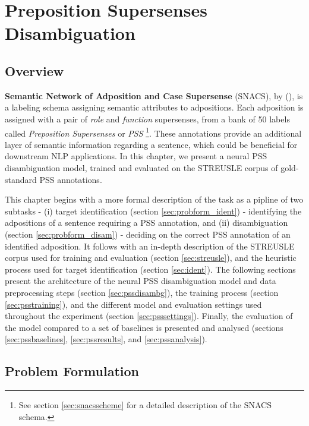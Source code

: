 
\chapter{Preposition Supersenses Disambiguation} %

\label{Chapter2} %

\section{Overview}
\textbf{Semantic Network of Adposition and Case Supersense} (SNACS), by (\cite{snacs}), is a labeling schema assigning semantic attributes to adpositions. Each adposition is assigned with a pair of \emph{role} and \emph{function} supersenses, from a bank of 50 labels called \emph{Preposition Supersenses} or \emph{PSS} \footnote{See section \ref{sec:snacsscheme} for a detailed description of the SNACS schema.}. These annotations provide an additional layer of semantic information regarding a sentence, which could be beneficial for downstream NLP applications. In this chapter, we present a neural PSS disambiguation model, trained and evaluated on the STREUSLE corpus of gold-standard PSS annotations. 

This chapter begins with a more formal description of the task as a pipline of two subtasks - (i) target identification (section \ref{sec:probform_ident}) - identifying the adpositions of a sentence requiring a PSS annotation, and (ii) disambiguation (section \ref{sec:probform_disam}) - deciding on the correct PSS annotation of an identified adposition. It follows with an in-depth description of the STREUSLE corpus used for training and evaluation (section \ref{sec:streusle}), and the heuristic process used for target identification (section \ref{sec:ident}). The following sections present the architecture of the neural PSS disambiguation model and data preprocessing steps (section \ref{sec:pssdisambg}), the training process (section \ref{sec:psstraining}), and the different model and evaluation settings used throughout the experiment (section \ref{sec:psssettings}).  Finally, the evaluation of the model compared to a set of baselines is presented and analysed (sections \ref{sec:pssbaselines}, \ref{sec:pssresults}, and \ref{sec:pssanalysis}).

\section{Problem Formulation} \label{sec:probform}
